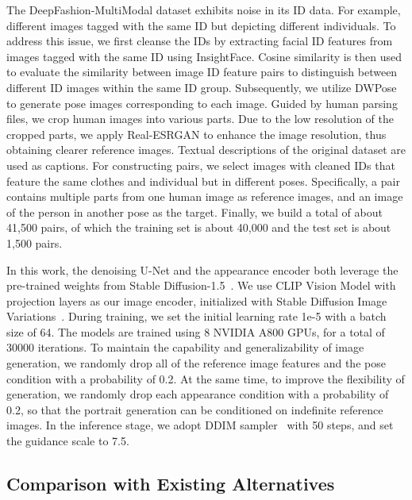 The DeepFashion-MultiModal dataset exhibits noise in its ID data. For example, different images tagged with the same ID but depicting different individuals. To address this issue, we first cleanse the IDs by extracting facial ID features from images tagged with the same ID using InsightFace\cite{deng2018arcface, InsightFaceProject}. Cosine similarity is then used to evaluate the similarity between image ID feature pairs to distinguish between different ID images within the same ID group. Subsequently, we utilize DWPose\cite{yang2023dwpose} to generate pose images corresponding to each image. Guided by human parsing files, we crop human images into various parts. Due to the low resolution of the cropped parts, we apply Real-ESRGAN\cite{wang2021realesrgan} to enhance the image resolution, thus obtaining clearer reference images. Textual descriptions of the original dataset are used as captions. For constructing pairs, we select images with cleaned IDs that feature the same clothes and individual but in different poses. Specifically, a pair contains multiple parts from one human image as reference images, and an image of the person in another pose as the target. Finally, we build a total of about 41,500 pairs, of which the training set is about 40,000 and the test set is about 1,500 pairs.

In this work, the denoising U-Net and the appearance encoder both leverage the pre-trained weights from Stable Diffusion-1.5~\cite{rombach2022ldm}. We use CLIP Vision Model with projection layers as our image encoder, initialized with Stable Diffusion Image Variations~\cite{sdimagevariation}. During training, we set the initial learning rate 1e-5 with a batch size of 64. The models are trained using 8 NVIDIA A800 GPUs, for a total of 30000 iterations. To maintain the capability and generalizability of image generation, we randomly drop all of the reference image features and the pose condition with a probability of 0.2. At the same time, to improve the flexibility of generation, we randomly drop each appearance condition with a probability of 0.2, so that the portrait generation can be conditioned on indefinite reference images. In the inference stage, we adopt DDIM sampler~\cite{song2020ddim} with 50 steps, and set the guidance scale to 7.5.

\subsection{Comparison with Existing Alternatives}

